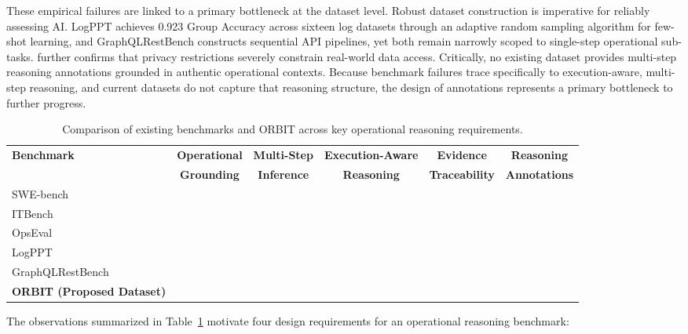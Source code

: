 \documentclass[conference]{IEEEtran}
\newcommand{\cmark}{\ding{51}}
\newcommand{\xmark}{\ding{55}}
\begin{document}
These empirical failures are linked to a primary bottleneck at the dataset level. Robust dataset construction is imperative for reliably assessing AI. LogPPT \cite{le2023log} achieves 0.923 Group Accuracy across sixteen log datasets through an adaptive random sampling algorithm for few-shot learning, and GraphQLRestBench \cite{saha2024sequential} constructs sequential API pipelines, yet both remain narrowly scoped to single-step operational sub-tasks. \cite{liu2025opseval} further confirms that privacy restrictions severely constrain real-world data access. Critically, no existing dataset provides multi-step reasoning annotations grounded in authentic operational contexts. Because benchmark failures trace specifically to execution-aware, multi-step reasoning, and current datasets do not capture that reasoning structure, the design of annotations represents a primary bottleneck to further progress.

\begin{table}[t]
\centering
\caption{Comparison of existing benchmarks and ORBIT across key operational reasoning requirements.}
\label{tab:benchmark_comparison}
\small
\begin{tabular}{lccccc}
\toprule
\textbf{Benchmark} &
\textbf{Operational} &
\textbf{Multi-Step} &
\textbf{Execution-Aware} &
\textbf{Evidence} &
\textbf{Reasoning} \\
&
\textbf{Grounding} &
\textbf{Inference} &
\textbf{Reasoning} &
\textbf{Traceability} &
\textbf{Annotations} \\
\midrule
SWE-bench~\cite{jimenez2023swe}      & \xmark & \cmark & \xmark & \cmark & \xmark \\
ITBench~\cite{jha2025itbench}        & \cmark & \cmark & \cmark & \xmark & \xmark \\
OpsEval~\cite{liu2025opseval}        & \cmark & \xmark & \cmark & \xmark & \xmark \\
LogPPT~\cite{le2023log}              & \cmark & \xmark & \xmark & \xmark & \xmark \\
GraphQLRestBench~\cite{saha2024sequential} & \xmark & \cmark & \xmark & \cmark & \xmark \\
\midrule
\textbf{ORBIT (Proposed Dataset)}                & \textbf{\cmark} & \textbf{\cmark} & \textbf{\cmark} & \textbf{\cmark} & \textbf{\cmark} \\
\bottomrule
\end{tabular}
\end{table}

The observations summarized in Table~\ref{tab:benchmark_comparison} motivate four design requirements for an operational reasoning benchmark:
\end{document}
